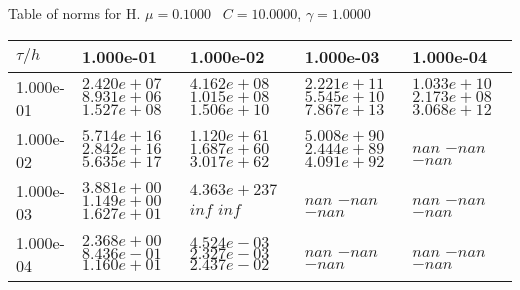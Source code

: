 \begin{center}
Table of norms for H. $\mu = 0.1000$ \, $C = 10.0000$, $\gamma = 1.0000$
  
\begin{tabular}{|p{1in}|p{1in}|p{1in}|p{1in}|p{1in}|} \hline
$\tau / h$ &1.000e-01 &1.000e-02 &1.000e-03 &1.000e-04 \\ \hline 
1.000e-01 & $2.420e+07$  $8.931e+06$  $1.527e+08$  & $4.162e+08$  $1.015e+08$  $1.506e+10$  & $2.221e+11$  $5.545e+10$  $7.867e+13$  & $1.033e+10$  $2.173e+08$  $3.068e+12$  \\ \hline 
1.000e-02 & $5.714e+16$  $2.842e+16$  $5.635e+17$  & $1.120e+61$  $1.687e+60$  $3.017e+62$  & $5.008e+90$  $2.444e+89$  $4.091e+92$  & $nan$  $-nan$  $-nan$  \\ \hline 
1.000e-03 & $3.881e+00$  $1.149e+00$  $1.627e+01$  & $4.363e+237$  $inf$  $inf$  & $nan$  $-nan$  $-nan$  & $nan$  $-nan$  $-nan$  \\ \hline 
1.000e-04 & $2.368e+00$  $8.436e-01$  $1.160e+01$  & $4.524e-03$  $2.327e-03$  $2.437e-02$  & $nan$  $-nan$  $-nan$  & $nan$  $-nan$  $-nan$  \\ \hline 

\end{tabular}\\[20pt]
\end{center}
